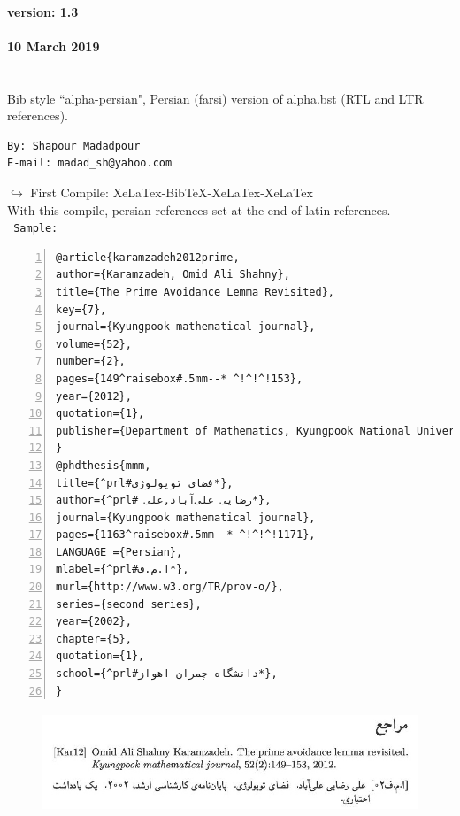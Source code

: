 \documentclass{article}
\begin{document}
\begin{latin}\tableofcontents
\paragraph{\color{red!50!black} version: 1.3}
\paragraph{\color{red!50!black}10 March 2019}
\section{}	\label{12}
\noindent
Bib style ``alpha-persian", Persian (farsi)  version of alpha.bst (RTL and LTR references).\\
\begin{Verbatim}[fontsize=\bf,commandchars=\^\#\*,baselinestretch=1,firstnumber=1,formatcom=\color{red!50!black}]
By: Shapour Madadpour
E-mail: madad_sh@yahoo.com
\end{Verbatim}
{\color{red}$\hookrightarrow$ First Compile:} XeLaTex-BibTeX-XeLaTex-XeLaTex\\
With this compile, persian references set at the end of latin references.\\
{\tt\color{blue} Sample:}
\end{latin}	
\begin{Verbatim}[numbers=left,fontsize=\bf,commandchars=\^\#\*,baselinestretch=1,firstnumber=1,formatcom=\color{green!50!black}]
@article{karamzadeh2012prime,
author={Karamzadeh, Omid Ali Shahny},
title={The Prime Avoidance Lemma Revisited},
key={7},
journal={Kyungpook mathematical journal},
volume={52},
number={2},
pages={149^raisebox#.5mm--* ^!^!^!153},
year={2012},
quotation={1},
publisher={Department of Mathematics, Kyungpook National University}
}
@phdthesis{mmm,
title={^prl#فضای توپولوژی*},
author={^prl# رضایی علی‌آباد,علی*},
journal={Kyungpook mathematical journal},
pages={1163^raisebox#.5mm--* ^!^!^!1171},
LANGUAGE ={Persian},
mlabel={^prl#ا.م.ف*},
murl={http://www.w3.org/TR/prov-o/},
series={second series},
year={2002},
chapter={5},
quotation={1},
school={^prl#دانشگاه چمران اهواز*},
}
\end{Verbatim}
\begin{figure}[H]
\centering
\includegraphics[width=\textwidth,height=3cm]{image/sh11}
\end{figure}
\end{document}
